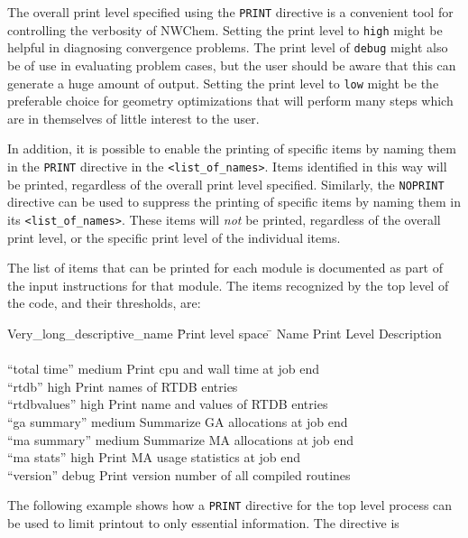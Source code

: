 The overall print level specified
using the \verb+PRINT+ directive is a convenient tool for controlling 
the verbosity
of NWChem. Setting the print level to \verb+high+ might be helpful in
diagnosing convergence problems.  The print level of \verb+debug+ might
also be of use in evaluating problem cases, but the user should be aware
that this can generate a huge amount of output.  Setting the print level
to \verb+low+ might be the preferable choice for geometry
optimizations that will perform many steps which are in themselves of
little interest to the user.

In addition, it is possible to enable the printing of specific
items by naming them in the \verb+PRINT+ directive in the 
\verb+<list_of_names>+.  Items identified in this way will be printed, 
regardless of the overall print level specified.  Similarly, the 
\verb+NOPRINT+ directive can be used to suppress the printing of specific
items by naming them in its \verb+<list_of_names>+.  These items will
{\em not} be printed, regardless of the overall print level, or the 
specific print level of the individual items.

The list of items that can be printed for each module is documented 
as part of the input instructions for that module.
The items recognized by the top level of the code, and their thresholds, 
are:
\begin{tabbing}
  Very\_long\_descriptive\_name \= Print level space \= \kill
  Name                   \> Print Level \> Description \\
                         \>        \> \\
 ``total time''        \> medium \> Print cpu and wall time at job end\\
 ``rtdb''              \> high    \> Print names of RTDB entries\\
 ``rtdbvalues''        \> high    \> Print name and values of RTDB entries\\
 ``ga summary''        \> medium \> Summarize GA allocations at job end \\
 ``ma summary''        \> medium \> Summarize MA allocations at job end \\
 ``ma stats''          \> high   \> Print MA usage statistics at job end \\
 ``version''           \> debug  \> Print version number of all compiled routines \\
\end{tabbing}


The following example shows how a \verb+PRINT+ directive for the top level
process can be used to limit printout to only essential information.
The directive is

